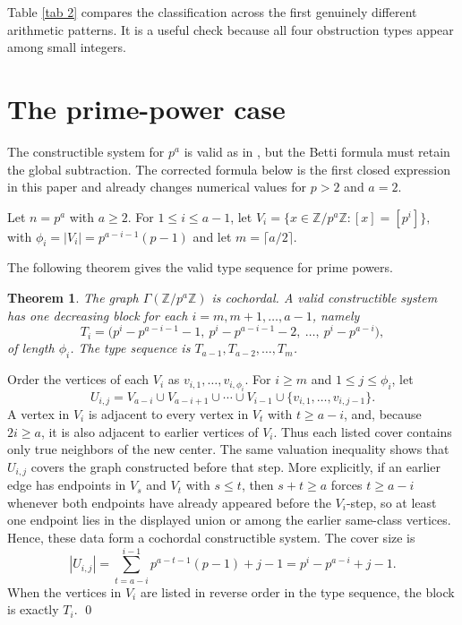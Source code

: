 \documentclass[12pt]{article}
\newtheorem{theorem}{Theorem}[section]
\theoremstyle{definition}
\renewenvironment{proof}{{\bf \noindent Proof.}}{\qed}
\begin{document}
\medskip

Table \ref{tab 2} compares the classification across the first genuinely different arithmetic patterns.  It is a useful check because all four obstruction types appear among small integers.



\section{The prime-power case}\label{sec:prime-powers}
 The constructible system for $p^a$ is valid as in \cite{DungVu2026}, but the Betti formula must retain the global subtraction.  The corrected formula below is the first closed expression in this paper and already changes numerical values for $p>2$ and $a=2$.

\medskip

Let $n=p^a$ with $a\geq 2$.  For $1\leq i\leq a-1$, let
$ V_i=\{x\in \mathbb{Z}/p^a\mathbb{Z}:[x]=[p^i]\}, $ with $\phi_i=|V_i|=p^{a-i-1}(p-1)$ and let $m=\lceil a/2\rceil$.

\medskip

\noindent The following theorem gives the valid type sequence for prime powers.
\begin{theorem}\label{thm:prime-power-type}
The graph $\Gamma(\mathbb{Z}/p^a\mathbb{Z})$ is cochordal.  A valid constructible system has one decreasing block for each $i=m,m+1,\ldots,a-1$, namely
$$
T_i=\bigl(p^i-p^{a-i-1}-1,\ p^i-p^{a-i-1}-2,\ \ldots,\ p^i-p^{a-i}\bigr),
$$
of length $\phi_i$.  The type sequence is $T_{a-1},T_{a-2},\ldots,T_m$.
\end{theorem}

\begin{proof}
Order the vertices of each $V_i$ as $v_{i,1},\ldots,v_{i,\phi_i}$.  For $i\geq m$ and $1\leq j\leq\phi_i$, let
$$
U_{i,j}=V_{a-i}\cup V_{a-i+1}\cup\cdots\cup V_{i-1}\cup\{v_{i,1},\ldots,v_{i,j-1}\}.
$$
A vertex in $V_i$ is adjacent to every vertex in $V_t$ with $t\geq a-i$, and, because $2i\geq a$, it is also adjacent to earlier vertices of $V_i$.  Thus each listed cover contains only true neighbors of the new center.  The same valuation inequality shows that $U_{i,j}$ covers the graph constructed before that step.  More explicitly, if an earlier edge has endpoints in $V_s$ and $V_t$ with $s\leq t$, then $s+t\geq a$ forces $t\geq a-i$ whenever both endpoints have already appeared before the $V_i$-step, so at least one endpoint lies in the displayed union or among the earlier same-class vertices.  Hence, these data form a cochordal constructible system.
 The cover size is
$$
|U_{i,j}|=\sum_{t=a-i}^{i-1}p^{a-t-1}(p-1)+j-1=p^i-p^{a-i}+j-1.
$$
When the vertices in $V_i$ are listed in reverse order in the type sequence, the block is exactly $T_i$.
\end{proof}
\end{document}
